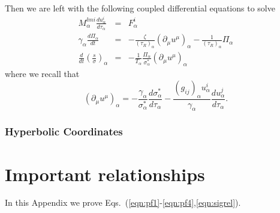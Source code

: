 \documentclass[aps,article]{revtex4}
\begin{document}
Then we are left with the following coupled differential equations to solve
\begin{eqnarray}
M_{\alpha}^{lmi} \frac{du^i_{\alpha}}{d\tau_{\alpha}}&=&F^i_{\alpha}\\
\gamma _{\alpha }\frac{d\Pi _{\alpha }}{dt}&=&-\frac{\zeta }{(\tau _{R})_{\alpha}}\left(
\partial _{\mu }u^{\mu }\right) _{\alpha }-\frac{1}{(\tau _{R})_{\alpha}}\Pi _{\alpha }\\
\frac{d}{dt}\left(\frac{s }{\sigma}\right) _{\alpha }&=&-\frac{1}{T _{\alpha }}\frac{\Pi _{\alpha }}{\sigma^* _{\alpha } }(\partial_{\mu}u^{\mu}) _{\alpha }
\end{eqnarray}
where we recall that
\begin{equation}
(\partial_{\mu}u^{\mu}) _{\alpha }=-\frac{\gamma _{\alpha }}{\sigma^* _{\alpha }}\frac{d\sigma^* _{\alpha }}{d\tau _{\alpha }}-\frac{(g_{ij} )_{\alpha }u^i _{\alpha }}{\gamma _{\alpha }}\frac{du^j _{\alpha }}{d\tau _{\alpha }}.
\end{equation}

\subsubsection{Hyperbolic Coordinates}





















\appendix
\section{Important relationships}\label{app:imptrel}

In this Appendix we prove Eqs.\ (\ref{eqn:pf1}-\ref{eqn:pf4},\ref{eqn:sigrel}). 
\end{document}
